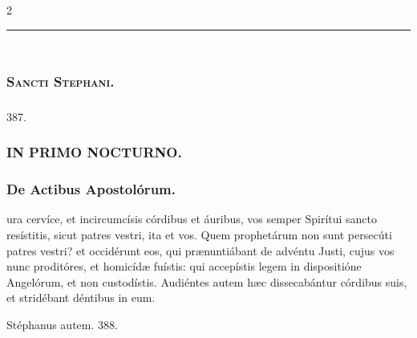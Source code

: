 \documentclass[9pt,twoside]{extarticle}
\begin{document}
\begin{multicols}{2}
\begin{tightlist}{}
\item {}
\end{tightlist}

\begin{center}\textcolor{red}{\rule{\linewidth}{0.5pt}} \end{center}

\subsection*{\center {}}
\subsubsection*{\center {}\\ \textsc{Sancti Stephani.}}
\subsubsection*{\center {}}

\begin{tightlist}{}
\item {} 387. 
\end{tightlist}

\subsubsection*{\center \textsc{IN PRIMO NOCTURNO.}}
\subsubsection*{\center De Actibus Apostolórum.}
\begin{center}\end{center}
ura cervíce, et incircumcísis córdibus et áuribus, vos semper Spirítui sancto resístitis, sicut patres vestri, ita et vos.
Quem prophetárum non sunt persecúti patres vestri? et occidérunt eos, qui prænuntiábant de advéntu Justi, cujus vos nunc proditóres, et homicídæ fuístis:
qui accepístis legem in dispositióne Angelórum, et non custodístis.
Audiéntes autem hæc dissecabántur córdibus suis, et stridébant déntibus in eum.

\begin{tightlist}{}
\item {} Stéphanus autem. 388.
\end{tightlist}


\end{multicols}
\end{document}
